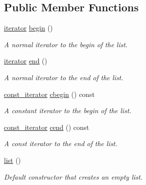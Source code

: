 \subsection*{Public Member Functions}
\begin{DoxyCompactItemize}
\item 
\mbox{\label{classsc_1_1list_ab78427459eb9bc9886b6a581a2c9c216}} 
\mbox{\hyperlink{classsc_1_1list_1_1iterator}{iterator}} \mbox{\hyperlink{classsc_1_1list_ab78427459eb9bc9886b6a581a2c9c216}{begin}} ()
\begin{DoxyCompactList}\small\item\em A normal iterator to the begin of the list. \end{DoxyCompactList}\item 
\mbox{\label{classsc_1_1list_a48429f0cf3d990fa6dfd5140e6aa95a7}} 
\mbox{\hyperlink{classsc_1_1list_1_1iterator}{iterator}} \mbox{\hyperlink{classsc_1_1list_a48429f0cf3d990fa6dfd5140e6aa95a7}{end}} ()
\begin{DoxyCompactList}\small\item\em A normal iterator to the end of the list. \end{DoxyCompactList}\item 
\mbox{\label{classsc_1_1list_ab128f2a6caa171927474485d9d2f05fc}} 
\mbox{\hyperlink{classsc_1_1list_1_1const__iterator}{const\+\_\+iterator}} \mbox{\hyperlink{classsc_1_1list_ab128f2a6caa171927474485d9d2f05fc}{cbegin}} () const
\begin{DoxyCompactList}\small\item\em A constant iterator to the begin of the list. \end{DoxyCompactList}\item 
\mbox{\label{classsc_1_1list_a058f029ebf0d6b5d66c78bb028b45eda}} 
\mbox{\hyperlink{classsc_1_1list_1_1const__iterator}{const\+\_\+iterator}} \mbox{\hyperlink{classsc_1_1list_a058f029ebf0d6b5d66c78bb028b45eda}{cend}} () const
\begin{DoxyCompactList}\small\item\em A const iterator to the end of the list. \end{DoxyCompactList}\item 
\mbox{\hyperlink{classsc_1_1list_ac7b95807230114dc58f2b1156cb3cdba}{list}} ()
\begin{DoxyCompactList}\small\item\em Default constructor that creates an empty list. \end{DoxyCompactList}\item 

\end{DoxyCompactItemize}
